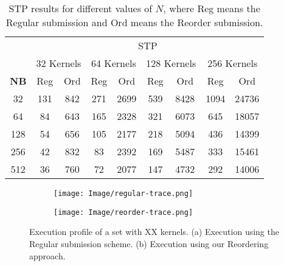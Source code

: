 \documentclass[conference]{IEEEtran}
\begin{document}
\begin{table}[htb]
    \centering
    \begin{tabular}{|c|c|c|c|c|c|c|c|c|} \hline
      & \multicolumn{8}{|c|}{STP} \\ \cline{2-9}
      & \multicolumn{2}{|c|}{32 Kernels} 
      & \multicolumn{2}{|c|}{64 Kernels} 
      & \multicolumn{2}{|c|}{128 Kernels} 
      & \multicolumn{2}{|c|}{256 Kernels}  \\ \cline{2-9}
 \textbf{NB} &  Reg & Ord &  Reg & Ord &  Reg & Ord &  Reg & Ord  \\ \hline
 32         &  131  & 842  &  271     & 2699 & 539     & 8428  &  1094    & 24736         \\ \hline
 64         &  84   & 643  &  165     & 2328 & 321     & 6073  &  645     & 18057       \\ \hline
 128        &  54   & 656  &  105     & 2177 & 218     & 5094  &  436     & 14399       \\ \hline
 256        &  42   & 832  &  83      & 2392 & 169     & 5487  &  333     & 15461       \\ \hline
 512        &  36   & 760  &  72      & 2077 & 147     & 4732  &  292     & 14006        \\ \hline
    \end{tabular}
    \caption{STP results for different values of $N$, where Reg means the Regular submission and Ord means the Reorder submission.}
    \label{tab:STP-Titan}
\end{table}

\begin{figure}
\centering
   \begin{subfigure}[b]{0.55\textwidth}
   \texttt{[image: Image/regular-trace.png]}
   \caption{}
   \label{fig:Ng1} 
\end{subfigure}

\begin{subfigure}[b]{0.55\textwidth}
   \texttt{[image: Image/reorder-trace.png]}
   \caption{}
   \label{fig:Ng2}
\end{subfigure}
\caption[Two numerical solutions]{Execution profile of a set with XX kernels. (a) Execution using the Regular submission scheme. (b) Execution using our Reordering approach.}
\label{fig:gpuutilization1}
\end{figure}

\end{document}
